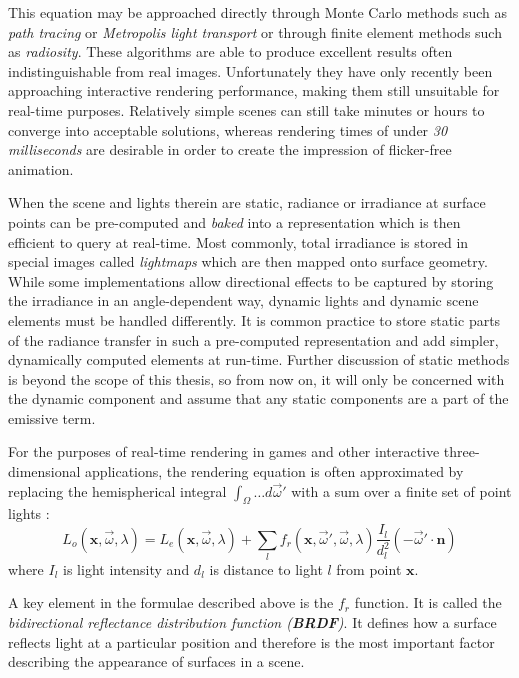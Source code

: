 This equation may be approached directly through Monte Carlo methods such as \emph{path tracing} or \emph{Metropolis light transport} or through finite element methods such as \emph{radiosity}. These algorithms are able to produce excellent results often indistinguishable from real images. Unfortunately they have only recently been approaching interactive rendering performance, making them still unsuitable for real-time purposes. Relatively simple scenes can still take minutes or hours to converge into acceptable solutions, whereas rendering times of under \emph{30 milliseconds} are desirable in order to create the impression of flicker-free animation.

When the scene and lights therein are static, radiance or irradiance at surface points can be pre-computed and \emph{baked} into a representation which is then efficient to query at real-time. Most commonly, total irradiance is stored in special images called \emph{lightmaps} which are then mapped onto surface geometry. While some implementations \cite{Chen08Halo3} allow directional effects to be captured by storing the irradiance in an angle-dependent way, dynamic lights and dynamic scene elements must be handled differently. It is common practice to store static parts of the radiance transfer in such a pre-computed representation and add simpler, dynamically computed elements at run-time. Further discussion of static methods is beyond the scope of this thesis, so from now on, it will only be concerned with the dynamic component and assume that any static components are a part of the emissive term.

For the purposes of real-time rendering in games and other interactive three-dimensional applications, the rendering equation is often approximated by replacing the hemispherical integral $\int_\Omega \ldots d \overrightarrow{\omega}'$ with a sum over a finite set of point lights \cite{Naty06Reflectance}:
\[
L_o(\mathbf x, \overrightarrow{\omega}, \lambda) = L_e(\mathbf x, \overrightarrow{\omega}, \lambda) + \sum_l f_r(\mathbf x, \overrightarrow{\omega}', \overrightarrow{\omega}, \lambda) \frac{I_l}{d_l^2} (-\overrightarrow{\omega}' \cdot \mathbf n)
\]
where $I_l$ is light intensity and $d_l$ is distance to light $l$ from point $\mathbf x$.

A key element in the formulae described above is the $f_r$ function. It is called the \emph{bidirectional reflectance distribution function (\textbf{BRDF})}. It defines how a surface reflects light at a particular position and therefore is the most important factor describing the appearance of surfaces in a scene.

